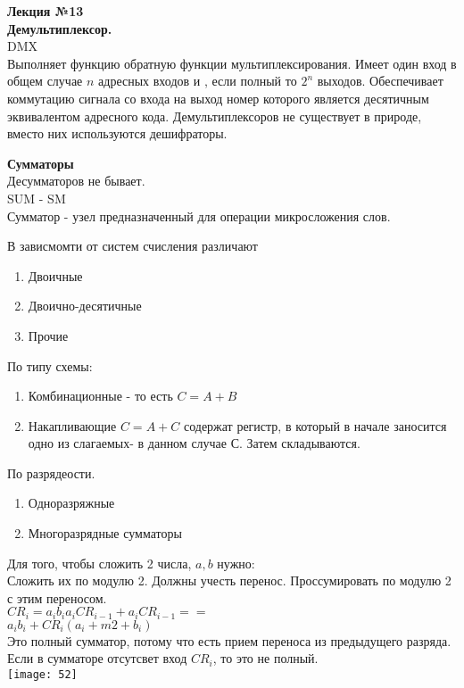 \LARGE{ \textbf {Лекция №13}}\\
\Large{ \textbf {Демультиплексор.}}\\
DMX\\
Выполняет функцию обратную функции мультиплексирования.
Имеет один вход в общем случае $n$ адресных входов и , если полный то $2^n$ выходов.
Обеспечивает коммутацию сигнала со входа на выход номер которого является десятичным эквивалентом адресного кода.
Демультиплексоров не существует в природе, вместо них используются дешифраторы.

\Large{ \textbf {Сумматоры}}\\
Десумматоров не бывает.\\
SUM - SM\\
Сумматор - узел предназначенный для операции микросложения слов.

В зависмомти от систем счисления различают
\begin{enumerate}
  \item Двоичные
  \item Двоично-десятичные
  \item Прочие
\end{enumerate}

По типу схемы:

\begin{enumerate}
  \item Комбинационные - то есть $ C = A + B $
  \item Накапливающие $ C = A + C $ содержат регистр, в который в начале заносится одно из слагаемых- в данном случае С. Затем складываются.
\end{enumerate}

По разрядеости.
\begin{enumerate}
  \item Одноразряжные
  \item Многоразрядные сумматоры
\end{enumerate}
Для того, чтобы сложить 2 числа, $a,b$ нужно:\\
Сложить их по модулю 2. Должны учесть перенос. Проссумировать по модулю 2 с этим переносом.\\

$CR_i = a_i b_i  a_i CR_{i-1} +a_i CR_{i-1} ==$\\
$a_i b_i + CR_i (a_i +m2+ b_i)$\\
Это полный сумматор, потому что есть прием переноса из предыдущего разряда.\\
Если в сумматоре отсутсвет вход $ CR_i $, то это не полный.\\
\texttt{[image: 52]}\\


